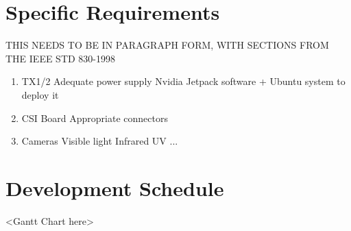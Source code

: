 \documentclass[letterpaper,10pt,serif,draftclsnofoot,onecolumn,compsoc,titlepage]{IEEEtran}
\begin{document}
\section{Specific Requirements}
THIS NEEDS TO BE IN PARAGRAPH FORM, WITH SECTIONS FROM THE IEEE STD 830-1998\\
\begin{enumerate}
	\item TX1/2
		\subitem Adequate power supply
		\subitem Nvidia Jetpack software + Ubuntu system to deploy it
	\item CSI Board
		\subitem Appropriate connectors
	\item Cameras
		\subitem Visible light
		\subitem Infrared
		\subitem UV
		\subitem ...
\end{enumerate}

\section{Development Schedule}

<Gantt Chart here>\\
\end{document}
